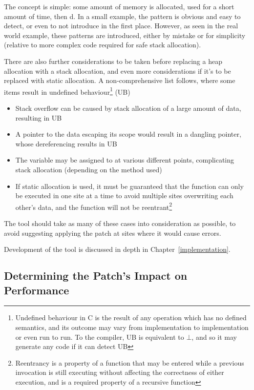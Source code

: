 The concept is simple: some amount of memory is allocated, used for a short amount of time, then \free{}d. In a small example, the pattern is obvious and easy to detect, or even to not introduce in the first place. However, as seen in the real world  example, these patterns are introduced, either by mistake or for simplicity (relative to more complex code required for safe stack allocation).

There are also further considerations to be taken before replacing a heap allocation with a stack allocation, and even more considerations if it's to be replaced with static allocation. A non-comprehensive list follows, where some items result in undefined behaviour\footnote{Undefined behaviour in C is the result of any operation which has no defined semantics, and its outcome may vary from implementation to implementation or even run to run. To the compiler, UB is equivalent to $\bot$, and so it may generate any code if it can detect UB} (UB)

\begin{itemize}
	\itemsep-0.25em
	\item Stack overflow can be caused by stack allocation of a large amount of data, resulting in UB
	\item A pointer to the data escaping its scope would result in a dangling pointer, whose dereferencing results in UB
	\item The variable may be assigned to at various different points, complicating stack allocation (depending on the method used)
	\item If static allocation is used, it must be guaranteed that the function can only be executed in one site at a time to avoid multiple sites overwriting each other's data, and the function will not be reentrant\footnote{Reentrancy is a property of a function that may be entered while a previous invocation is still executing without affecting the correctness of either execution, and is a required property of a recursive function}
\end{itemize}

The tool should take as many of these cases into consideration as possible, to avoid suggesting applying the patch at sites where it would cause errors.

Development of the tool is discussed in depth in Chapter~\ref{implementation}.

\subsection{Determining the Patch's Impact on Performance}

